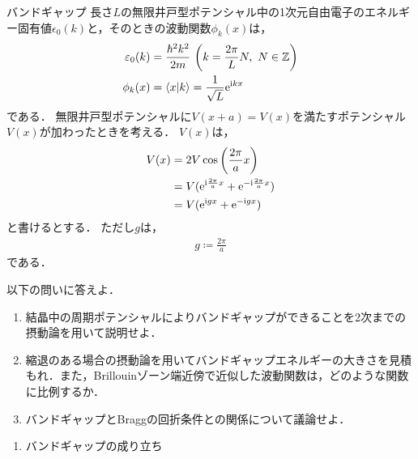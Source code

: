 \documentclass{report}
\begin{document}
  \begin{myex}{バンドギャップ}{}
    長さ$L$の無限井戸型ポテンシャル中の1次元自由電子のエネルギー固有値$\epsilon_0(k)$と，そのときの波動関数$\phi_k(x)$は，
    \begin{align}
      \varepsilon_0(k) &= \frac{\hbar^2k^2}{2m}\ \qty(k = \frac{2\pi}{L}N,\ N\in\mathbb{Z}) \\ 
      \phi_k(x) &= \braket{x}{k} = \frac{1}{\sqrt{L}}\mathrm{e}^{\mathrm{i} kx} 
    \end{align}
    である．
    無限井戸型ポテンシャルに$V(x + a) = V(x)$を満たすポテンシャル$V(x)$が加わったときを考える．
    $V(x)$は，
    \begin{align}
      V(x)& = 2V\cos\qty(\frac{2\pi}{a}x)\\
      & = V(\mathrm{e}^{\mathrm{i}\frac{2\pi}{a}x} + \mathrm{e}^{-\mathrm{i}\frac{2\pi}{a}x})\\
      & = V(\mathrm{e}^{\mathrm{i} gx} + \mathrm{e}^{-\mathrm{i} gx})
    \end{align}
    と書けるとする．
    ただし$g$は，
    \begin{align}
      g\coloneqq \frac{2\pi}{a}\label{wave-number-g-def}
    \end{align}
    である．
    \par
    以下の問いに答えよ．
    \begin{enumerate}
      \item 結晶中の周期ポテンシャルによりバンドギャップができることを2次までの摂動論を用いて説明せよ．
      \item 縮退のある場合の摂動論を用いてバンドギャップエネルギーの大きさを見積もれ．また，Brillouinゾーン端近傍で近似した波動関数は，どのような関数に比例するか．
      \item バンドギャップとBraggの回折条件との関係について議論せよ．
    \end{enumerate}
    \tcblower
    \begin{enumerate}
      \item バンドギャップの成り立ち \par
        

\end{enumerate}
\end{myex}
\end{document}
